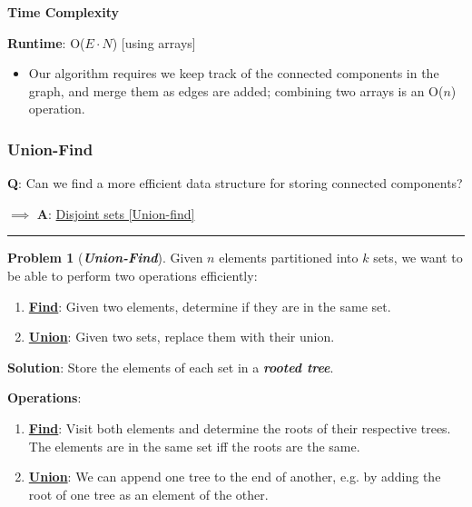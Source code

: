 \documentclass[12pt]{extarticle}
\theoremstyle{definition}
\newtheorem*{problem}{Problem}
\theoremstyle{remark}
\newcommand{\probname}[1]{\noindent \textbf{\textit{#1}}}
\begin{document}
\noindent\textbf{Time Complexity}

\vspace{3pt}
\noindent\textbf{Runtime}: O($E\cdot N$) [using arrays]
\begin{itemize}
    \item Our algorithm requires we keep track of the connected components in the graph, and merge them as edges are added; combining two arrays is an O($n$) operation.
\end{itemize}

\pagebreak
\subsubsection{Union-Find}

\noindent\textbf{Q}: Can we find a more efficient data structure for storing connected components?

\vspace{3pt}
\noindent$\implies$ \textbf{A}: \ul{Disjoint sets [Union-find]}

\begin{center}
    \vspace{2pt}
    \rule{50mm}{0.4pt}
\end{center}

\vspace{3pt}
\begin{problem}[\probname{Union-Find}]
    Given $n$ elements partitioned into $k$ sets, we want to be able to perform two operations efficiently: \begin{enumerate}
        \item \ul{\textbf{Find}}: Given two elements, determine if they are in the same set.
        \item \ul{\textbf{Union}}: Given two sets, replace them with their union.
    \end{enumerate}
\end{problem}

\vspace{10pt}
\noindent\textbf{Solution}: Store the elements of each set in a \textbf{\textit{rooted tree}}.

\vspace{5pt}
\noindent \textbf{Operations}:
\begin{enumerate}
    \item \ul{\textbf{Find}}: Visit both elements and determine the roots of their respective trees. The elements are in the same set iff the roots are the same.
    \item \ul{\textbf{Union}}: We can append one tree to the end of another, e.g. by adding the root of one tree as an element of the other.
\end{enumerate}
\end{document}
